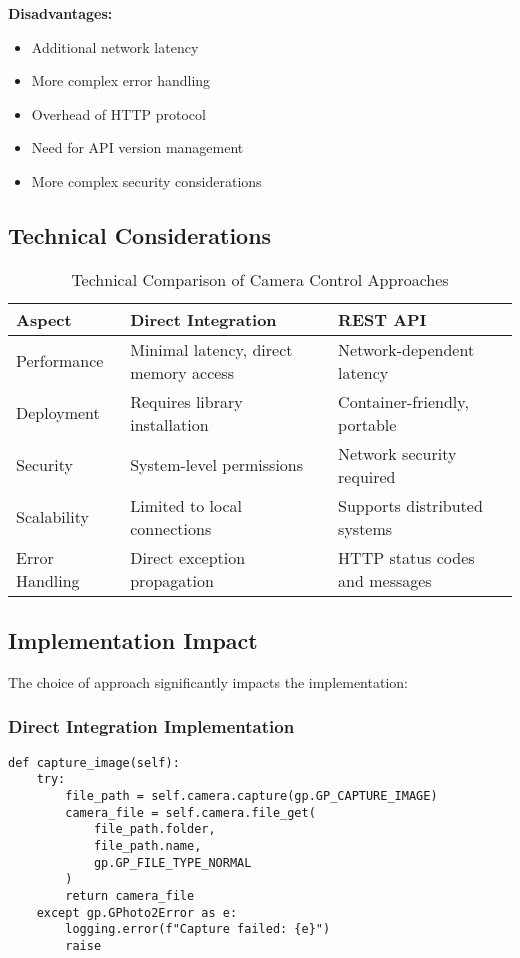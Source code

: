 \textbf{Disadvantages:}
\begin{itemize}
    \item Additional network latency
    \item More complex error handling
    \item Overhead of HTTP protocol
    \item Need for API version management
    \item More complex security considerations
\end{itemize}

\subsection{Technical Considerations}

\begin{table}[h]
\centering
\begin{tabular}{|p{3cm}|p{5cm}|p{5cm}|}
\hline
\textbf{Aspect} & \textbf{Direct Integration} & \textbf{REST API} \\
\hline
Performance & Minimal latency, direct memory access & Network-dependent latency \\
\hline
Deployment & Requires library installation & Container-friendly, portable \\
\hline
Security & System-level permissions & Network security required \\
\hline
Scalability & Limited to local connections & Supports distributed systems \\
\hline
Error Handling & Direct exception propagation & HTTP status codes and messages \\
\hline
\end{tabular}
\caption{Technical Comparison of Camera Control Approaches}
\label{table:camera_control_comparison}
\end{table}

\subsection{Implementation Impact}

The choice of approach significantly impacts the implementation:

\subsubsection{Direct Integration Implementation}
\begin{verbatim}
def capture_image(self):
    try:
        file_path = self.camera.capture(gp.GP_CAPTURE_IMAGE)
        camera_file = self.camera.file_get(
            file_path.folder, 
            file_path.name, 
            gp.GP_FILE_TYPE_NORMAL
        )
        return camera_file
    except gp.GPhoto2Error as e:
        logging.error(f"Capture failed: {e}")
        raise
\end{verbatim}

